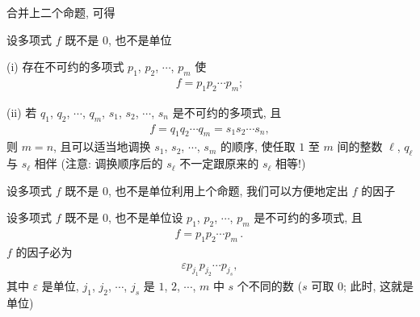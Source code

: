 合并上二个命题, 可得
\begin{proposition}
    设多项式 $f$ 既不是 $0$, 也不是单位\period

    (i) 存在不可约的多项式 $p_1$, $p_2$, $\cdots$, $p_m$ 使
    \begin{align*}
        f = p_1 p_2 \cdots p_m;
    \end{align*}

    (ii) 若 $q_1$, $q_2$, $\cdots$, $q_m$, $s_1$, $s_2$, $\cdots$, $s_n$ 是不可约的多项式, 且
    \begin{align*}
        f = q_1 q_2 \cdots q_m = s_1 s_2 \cdots s_n,
    \end{align*}
    则 $m = n$, 且可以适当地调换 $s_1$, $s_2$, $\cdots$, $s_m$ 的顺序, 使任取 $1$ 至 $m$ 间的整数 $\ell$, $q_\ell$ 与 $s_\ell$ 相伴 (注意: 调换顺序后的 $s_\ell$ 不一定跟原来的 $s_\ell$ 相等!)\period
\end{proposition}

设多项式 $f$ 既不是 $0$, 也不是单位\period 利用上个命题, 我们可以方便地定出 $f$ 的因子\period

\begin{proposition}
    设多项式 $f$ 既不是 $0$, 也不是单位\period 设 $p_1$, $p_2$, $\cdots$, $p_m$ 是不可约的多项式, 且
    \begin{align*}
        f = p_1 p_2 \cdots p_m \period
    \end{align*}
    $f$ 的因子必为
    \begin{align*}
        \varepsilon p_{j_1} p_{j_2} \cdots p_{j_s} \tag*{(\myStar)},
    \end{align*}
    其中 $\varepsilon$ 是单位, $j_1$, $j_2$, $\cdots$, $j_s$ 是 $1$, $2$, $\cdots$, $m$ 中 $s$ 个不同的数 ($s$ 可取 $0$; 此时, 这就是单位)\period
\end{proposition}

